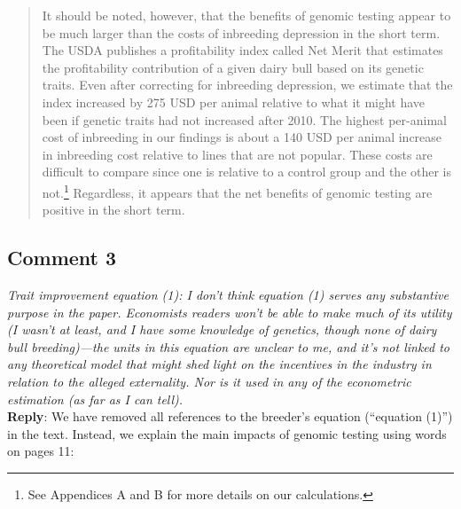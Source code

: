 \documentclass[12pt,letterpaper]{article}
\begin{document}
\begin{quote}
It should be noted, however, that the benefits of genomic testing appear to be much larger than the costs of inbreeding depression in the short term. 
The USDA publishes a profitability index called Net Merit that estimates the profitability contribution of a given dairy bull based on its genetic traits.
Even after correcting for inbreeding depression, we estimate that the index increased by 275 USD per animal relative to what it might have been if genetic traits had not increased after 2010.
The highest per-animal cost of inbreeding in our findings is about a 140 USD per animal increase in inbreeding cost relative to lines that are not popular. 
These costs are difficult to compare since one is relative to a control group and the other is not.\footnote{See Appendices A and B for more details on our calculations.}
Regardless, it appears that the net benefits of genomic testing are positive in the short term.
\end{quote}

\subsection*{Comment 3}
{\it
Trait improvement equation (1): I don’t think equation (1) serves any substantive
purpose in the paper. Economists readers won’t be able to make much of its utility (I wasn’t at least, and I have some knowledge of genetics, though none of dairy bull breeding)—the units in this equation are unclear to me, and it’s not linked to any theoretical model that might shed light on the incentives in the industry in relation to the alleged externality. Nor is it used in any of the econometric estimation (as far as I can tell).} \\

\textbf{Reply}: We have removed all references to the breeder's equation (``equation (1)'') in the text. Instead, we explain the main impacts of genomic testing using words on pages 11:
\end{document}
